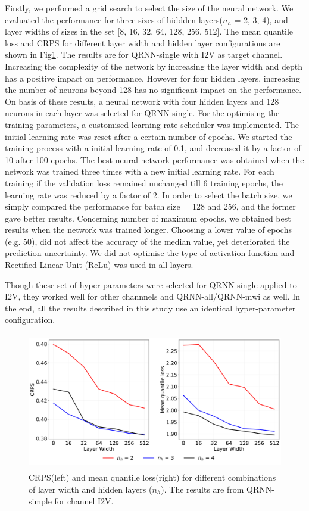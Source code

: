\documentclass[amt, manuscript]{copernicus}
\begin{document}
Firstly, we performed a grid search to select the size of the neural network. We evaluated the performance for three sizes of hiddden layers($n_h$ = 2, 3, 4), and layer widths of sizes in the set [8, 16, 32, 64, 128, 256, 512]. The mean quantile loss and CRPS for different layer width and hidden layer configurations are shown in Fig\ref{fig:grid_search}. The results are for QRNN-single with I2V as target channel. Increasing the complexity of the network by increasing the layer width and depth has a positive impact on performance. However for four hidden layers, increasing the number of neurons beyond 128 has no significant impact on the performance. On basis of these results, a neural network with four hidden layers and 128 neurons in each layer was selected for QRNN-single. For the optimising the training parameters, a customised  learning rate scheduler was implemented. The initial learning rate was reset after a certain number of epochs.  We started the training process with a initial learning rate of 0.1, and decreased it by a factor of 10 after 100 epochs. The best neural network performance was obtained when the network was trained three times with a new initial learning rate. For each training  if the validation loss remained unchanged till 6 training epochs, the learning rate was reduced by a factor of 2. In order to select the batch size, we simply compared the performance for batch size = 128 and 256, and the former gave better results. Concerning number of maximum epochs, we obtained best results when the network was trained longer. Choosing a lower value of epochs (e.g. 50), did not affect the accuracy of the median value, yet deteriorated the prediction uncertainty. We did not optimise the type of activation function and Rectified Linear Unit (ReLu) was used in all layers. 

Though these set of hyper-parameters were selected for QRNN-single applied to I2V, they worked well for other channnels and QRNN-all/QRNN-mwi as well. In the end, all the results described in this study use an identical hyper-parameter configuration.

\begin{figure}[t]
	\centering
	\includegraphics[height=60mm]{Figures/CRPS.pdf} 
	\caption{CRPS(left) and mean quantile loss(right) for different combinations of layer width and hidden layers ($n_h$). The results are from QRNN-simple for channel I2V.}
	\label{fig:grid_search}	
\end{figure}
\end{document}
